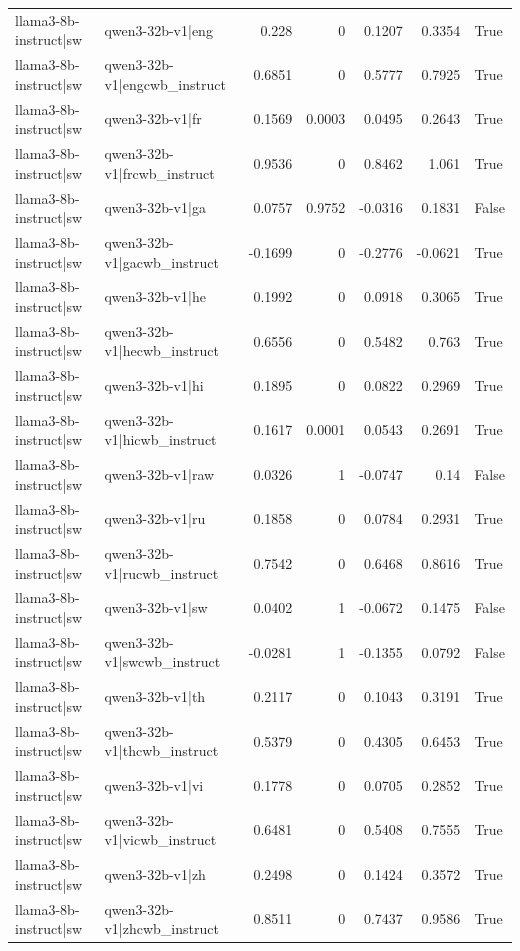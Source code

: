 \begin{table}
\begin{tabular}{l l r r r r l}
llama3-8b-instruct|sw & qwen3-32b-v1|eng & 0.228 & 0 & 0.1207 & 0.3354 & True \\
llama3-8b-instruct|sw & qwen3-32b-v1|engcwb_instruct & 0.6851 & 0 & 0.5777 & 0.7925 & True \\
llama3-8b-instruct|sw & qwen3-32b-v1|fr & 0.1569 & 0.0003 & 0.0495 & 0.2643 & True \\
llama3-8b-instruct|sw & qwen3-32b-v1|frcwb_instruct & 0.9536 & 0 & 0.8462 & 1.061 & True \\
llama3-8b-instruct|sw & qwen3-32b-v1|ga & 0.0757 & 0.9752 & -0.0316 & 0.1831 & False \\
llama3-8b-instruct|sw & qwen3-32b-v1|gacwb_instruct & -0.1699 & 0 & -0.2776 & -0.0621 & True \\
llama3-8b-instruct|sw & qwen3-32b-v1|he & 0.1992 & 0 & 0.0918 & 0.3065 & True \\
llama3-8b-instruct|sw & qwen3-32b-v1|hecwb_instruct & 0.6556 & 0 & 0.5482 & 0.763 & True \\
llama3-8b-instruct|sw & qwen3-32b-v1|hi & 0.1895 & 0 & 0.0822 & 0.2969 & True \\
llama3-8b-instruct|sw & qwen3-32b-v1|hicwb_instruct & 0.1617 & 0.0001 & 0.0543 & 0.2691 & True \\
llama3-8b-instruct|sw & qwen3-32b-v1|raw & 0.0326 & 1 & -0.0747 & 0.14 & False \\
llama3-8b-instruct|sw & qwen3-32b-v1|ru & 0.1858 & 0 & 0.0784 & 0.2931 & True \\
llama3-8b-instruct|sw & qwen3-32b-v1|rucwb_instruct & 0.7542 & 0 & 0.6468 & 0.8616 & True \\
llama3-8b-instruct|sw & qwen3-32b-v1|sw & 0.0402 & 1 & -0.0672 & 0.1475 & False \\
llama3-8b-instruct|sw & qwen3-32b-v1|swcwb_instruct & -0.0281 & 1 & -0.1355 & 0.0792 & False \\
llama3-8b-instruct|sw & qwen3-32b-v1|th & 0.2117 & 0 & 0.1043 & 0.3191 & True \\
llama3-8b-instruct|sw & qwen3-32b-v1|thcwb_instruct & 0.5379 & 0 & 0.4305 & 0.6453 & True \\
llama3-8b-instruct|sw & qwen3-32b-v1|vi & 0.1778 & 0 & 0.0705 & 0.2852 & True \\
llama3-8b-instruct|sw & qwen3-32b-v1|vicwb_instruct & 0.6481 & 0 & 0.5408 & 0.7555 & True \\
llama3-8b-instruct|sw & qwen3-32b-v1|zh & 0.2498 & 0 & 0.1424 & 0.3572 & True \\
llama3-8b-instruct|sw & qwen3-32b-v1|zhcwb_instruct & 0.8511 & 0 & 0.7437 & 0.9586 & True \\

\end{tabular}
\end{table}

